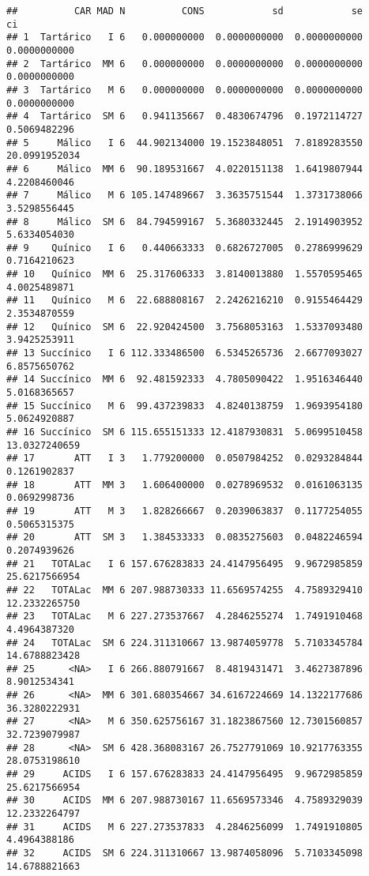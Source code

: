 \documentclass[
]{article}
\begin{document}
\begin{verbatim}
##          CAR MAD N          CONS            sd            se            ci
## 1  Tartárico   I 6   0.000000000  0.0000000000  0.0000000000  0.0000000000
## 2  Tartárico  MM 6   0.000000000  0.0000000000  0.0000000000  0.0000000000
## 3  Tartárico   M 6   0.000000000  0.0000000000  0.0000000000  0.0000000000
## 4  Tartárico  SM 6   0.941135667  0.4830674796  0.1972114727  0.5069482296
## 5     Málico   I 6  44.902134000 19.1523848051  7.8189283550 20.0991952034
## 6     Málico  MM 6  90.189531667  4.0220151138  1.6419807944  4.2208460046
## 7     Málico   M 6 105.147489667  3.3635751544  1.3731738066  3.5298556445
## 8     Málico  SM 6  84.794599167  5.3680332445  2.1914903952  5.6334054030
## 9    Quínico   I 6   0.440663333  0.6826727005  0.2786999629  0.7164210623
## 10   Quínico  MM 6  25.317606333  3.8140013880  1.5570595465  4.0025489871
## 11   Quínico   M 6  22.688808167  2.2426216210  0.9155464429  2.3534870559
## 12   Quínico  SM 6  22.920424500  3.7568053163  1.5337093480  3.9425253911
## 13 Succínico   I 6 112.333486500  6.5345265736  2.6677093027  6.8575650762
## 14 Succínico  MM 6  92.481592333  4.7805090422  1.9516346440  5.0168365657
## 15 Succínico   M 6  99.437239833  4.8240138759  1.9693954180  5.0624920887
## 16 Succínico  SM 6 115.655151333 12.4187930831  5.0699510458 13.0327240659
## 17       ATT   I 3   1.779200000  0.0507984252  0.0293284844  0.1261902837
## 18       ATT  MM 3   1.606400000  0.0278969532  0.0161063135  0.0692998736
## 19       ATT   M 3   1.828266667  0.2039063837  0.1177254055  0.5065315375
## 20       ATT  SM 3   1.384533333  0.0835275603  0.0482246594  0.2074939626
## 21   TOTALac   I 6 157.676283833 24.4147956495  9.9672985859 25.6217566954
## 22   TOTALac  MM 6 207.988730333 11.6569574255  4.7589329410 12.2332265750
## 23   TOTALac   M 6 227.273537667  4.2846255274  1.7491910468  4.4964387320
## 24   TOTALac  SM 6 224.311310667 13.9874059778  5.7103345784 14.6788823428
## 25      <NA>   I 6 266.880791667  8.4819431471  3.4627387896  8.9012534341
## 26      <NA>  MM 6 301.680354667 34.6167224669 14.1322177686 36.3280222931
## 27      <NA>   M 6 350.625756167 31.1823867560 12.7301560857 32.7239079987
## 28      <NA>  SM 6 428.368083167 26.7527791069 10.9217763355 28.0753198610
## 29     ACIDS   I 6 157.676283833 24.4147956495  9.9672985859 25.6217566954
## 30     ACIDS  MM 6 207.988730167 11.6569573346  4.7589329039 12.2332264797
## 31     ACIDS   M 6 227.273537833  4.2846256099  1.7491910805  4.4964388186
## 32     ACIDS  SM 6 224.311310667 13.9874058096  5.7103345098 14.6788821663
\end{verbatim}
\end{document}
